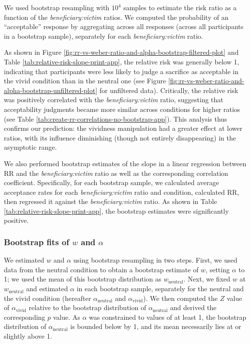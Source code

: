 \documentclass[
]{article}
\begin{document}
We used bootstrap resampling with \ensuremath{10^{4}} samples to estimate the risk ratio as a function of the \emph{beneficiary:victim} ratios. We computed the probability of an ``acceptable'' response by aggregating across all responses (across all participants in a bootstrap sample), separately for each \emph{beneficiary:victim} ratio.

As shown in Figure \ref{fig:rr-vs-weber-ratio-and-alpha-bootstrap-filtered-plot} and Table \ref{tab:relative-risk-slope-print-app}, the relative risk was generally below 1, indicating that participants were less likely to judge a sacrifice as acceptable in the vivid condition than in the neutral one (see Figure \ref{fig:rr-vs-weber-ratio-and-alpha-bootstrap-unfiltered-plot} for unfiltered data). Critically, the relative risk was positively correlated with the \emph{beneficiary:victim} ratio, suggesting that acceptability judgments became more similar across conditions for higher ratios (see Table \ref{tab:create-rr-correlations-no-bootstrap-app}). This analysis thus confirms our prediction: the vividness manipulation had a greater effect at lower ratios, with its influence diminishing (though not entirely disappearing) in the asymptotic range.

We also performed bootstrap estimates of the slope in a linear regression between \(\mathrm{RR}\) and the \emph{beneficiary:victim} ratio as well as the corresponding correlation coefficient. Specifically, for each bootstrap sample, we calculated average acceptance rates for each \emph{beneficiary:victim} ratio and condition, calculated \(\mathrm{RR}\), then regressed it against the \emph{beneficiary:victim} ratio. As shown in Table \ref{tab:relative-risk-slope-print-app}, the bootstrap estimates were significantly positive.

\subsubsection{\texorpdfstring{Bootstrap fits of \(w\) and \(\alpha\)}{Bootstrap fits of w and \textbackslash alpha}}\label{bootstrap-fits-of-w-and-alpha}

We estimated \(w\) and \(\alpha\) using bootstrap resampling in two steps. First, we used data from the neutral condition to obtain a bootstrap estimate of \(w\), setting \(\alpha\) to 1; we used the mean of this bootstrap distribution as \(w_\text{neutral}\). Next, we fixed \(w\) at \(w_\text{neutral}\) and estimated \(\alpha\) in each bootstrap sample, separately for the neutral and the vivid condition (hereafter \(\alpha_\text{neutral}\) and \(\alpha_\text{vivid}\)). We then computed the \(Z\) value of \(\alpha_\text{vivid}\) relative to the bootstrap distribution of \(\alpha_\text{neutral}\) and derived the corresponding \(p\) value. As \(\alpha\) was constrained to values of at least 1, the bootstrap distribution of \(\alpha_\text{neutral}\) is bounded below by 1, and its mean necessarily lies at or slightly above 1.
\end{document}
